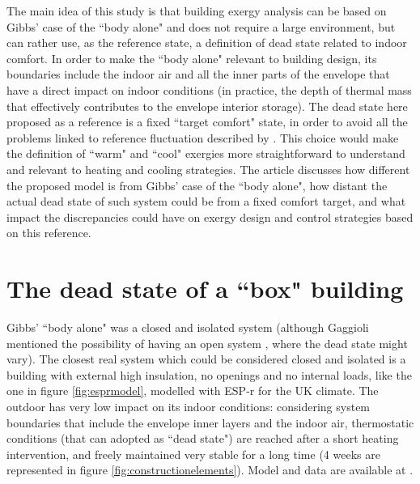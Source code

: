 \documentclass[10pt]{extarticle} %
\begin{document}
The main idea of this study is that building exergy analysis can be based on Gibbs' case of the ``body alone" and does not require a large environment, but can rather use, as the reference state, a definition of dead state related to indoor comfort. In order to make the ``body alone" relevant to building design, its boundaries include the indoor air and all the inner parts of the envelope that have a direct impact on indoor conditions (in practice, the depth of thermal mass that effectively contributes to the envelope interior storage). The dead state here proposed as a reference is a fixed ``target comfort" state, in order to avoid all the problems linked to reference fluctuation described by \cite{Pons2019}. This choice would make the definition of ``warm" and ``cool" exergies more straightforward to understand and relevant to heating and cooling strategies. The article discusses how different the proposed model is from Gibbs' case of the ``body alone", how distant the actual dead state of such system could be from a fixed comfort target, and what impact the discrepancies could have on exergy design and control strategies based on this reference.


\section{The dead state of a ``box" building} \label{subsec:simple}

Gibbs' ``body alone" was a closed and isolated system (although Gaggioli mentioned the possibility of having an open system \citep{Gaggioli1961}, where the dead state might vary). The closest real system which could be considered closed and isolated is a building with external high insulation, no openings and no internal loads, like the one in figure \ref{fig:esprmodel}, modelled with ESP-r for the UK climate. The outdoor has very low impact on its indoor conditions: considering system boundaries that include the envelope inner layers and the indoor air, thermostatic conditions (that can adopted as ``dead state") are reached after a short heating intervention, and freely maintained very stable for a long time (4 weeks are represented in figure \ref{fig:constructionelements}). Model and data are available at \cite{Bonetti2020}.
\end{document}
